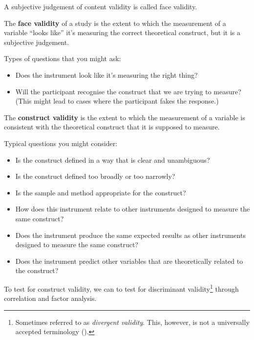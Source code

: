 \documentclass[
  11pt,
  a4paper,
  twoside,symmetric,openright]{book}
\providecommand{\tightlist}{%
  \setlength{\itemsep}{0pt}\setlength{\parskip}{0pt}}
\theoremstyle{break}
\theoremstyle{break}
\begin{document}
A subjective judgement of content validity is called face validity.

\begin{definition}
\protect\hypertarget{def:deffacevalidity}{}\label{def:deffacevalidity}The \textbf{face validity} of a study is the extent to which the measurement of a variable ``looks like'' it's measuring the correct theoretical construct, but it is a subjective judgement.
\end{definition}

Types of questions that you might ask:

\begin{itemize}
\tightlist
\item
  Does the instrument look like it's measuring the right thing?
\item
  Will the participant recognise the construct that we are trying to measure? (This might lead to cases where the participant fakes the response.)
\end{itemize}

\begin{definition}
\protect\hypertarget{def:defconstructvalidity}{}\label{def:defconstructvalidity}The \textbf{construct validity} is the extent to which the measurement of a variable is consistent with the theoretical construct that it is supposed to measure.
\end{definition}

Typical questions you might consider:

\begin{itemize}
\tightlist
\item
  Is the construct defined in a way that is clear and unambiguous?
\item
  Is the construct defined too broadly or too narrowly?
\item
  Is the sample and method appropriate for the construct?
\item
  How does this instrument relate to other instruments designed to measure the same construct?
\item
  Does the instrument produce the same expected results as other instruments designed to measure the same construct?
\item
  Does the instrument predict other variables that are theoretically related to the construct?
\end{itemize}

To test for construct validity, we can to test for discriminant validity\footnote{Sometimes referred to as \emph{divergent validity}. This, however, is not a universally accepted terminology ().} through correlation and factor analysis.
\end{document}
